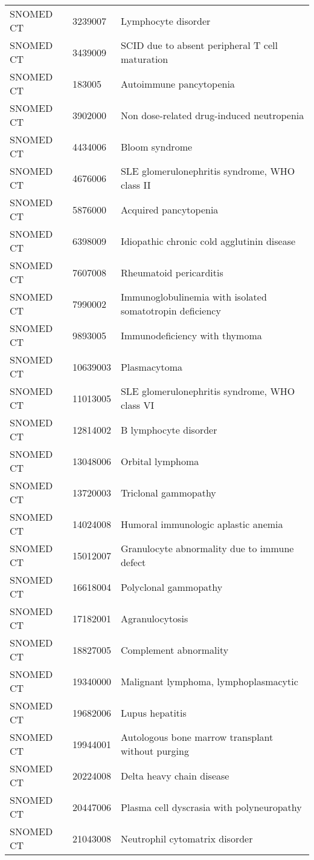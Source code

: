 \begin{table}[ht]
\begin{tabular}{lll}
  SNOMED CT & 3239007 & Lymphocyte disorder \\ 
  SNOMED CT & 3439009 & SCID due to absent peripheral T cell maturation \\ 
  SNOMED CT & 183005 & Autoimmune pancytopenia \\ 
  SNOMED CT & 3902000 & Non dose-related drug-induced neutropenia \\ 
  SNOMED CT & 4434006 & Bloom syndrome \\ 
  SNOMED CT & 4676006 & SLE glomerulonephritis syndrome, WHO class II \\ 
  SNOMED CT & 5876000 & Acquired pancytopenia \\ 
  SNOMED CT & 6398009 & Idiopathic chronic cold agglutinin disease \\ 
  SNOMED CT & 7607008 & Rheumatoid pericarditis \\ 
  SNOMED CT & 7990002 & Immunoglobulinemia with isolated somatotropin deficiency \\ 
  SNOMED CT & 9893005 & Immunodeficiency with thymoma \\ 
  SNOMED CT & 10639003 & Plasmacytoma \\ 
  SNOMED CT & 11013005 & SLE glomerulonephritis syndrome, WHO class VI \\ 
  SNOMED CT & 12814002 & B lymphocyte disorder \\ 
  SNOMED CT & 13048006 & Orbital lymphoma \\ 
  SNOMED CT & 13720003 & Triclonal gammopathy \\ 
  SNOMED CT & 14024008 & Humoral immunologic aplastic anemia \\ 
  SNOMED CT & 15012007 & Granulocyte abnormality due to immune defect \\ 
  SNOMED CT & 16618004 & Polyclonal gammopathy \\ 
  SNOMED CT & 17182001 & Agranulocytosis \\ 
  SNOMED CT & 18827005 & Complement abnormality \\ 
  SNOMED CT & 19340000 & Malignant lymphoma, lymphoplasmacytic \\ 
  SNOMED CT & 19682006 & Lupus hepatitis \\ 
  SNOMED CT & 19944001 & Autologous bone marrow transplant without purging \\ 
  SNOMED CT & 20224008 & Delta heavy chain disease \\ 
  SNOMED CT & 20447006 & Plasma cell dyscrasia with polyneuropathy \\ 
  SNOMED CT & 21043008 & Neutrophil cytomatrix disorder \\ 

\end{tabular}
\end{table}
